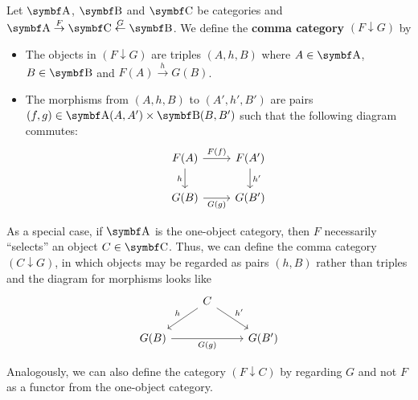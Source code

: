 \begin{definition}\label{def:comma_category}\cite[definition 2.3.1]{Leinster2014}
  Let \( \Bold A \), \( \Bold B \) and \( \Bold C \) be categories and \( \Bold A \overset F \to \Bold C \overset G \leftarrow \Bold B \). We define the \textbf{comma category} \( (F \downarrow G) \) by
  \begin{itemize}
    \item The objects in \( (F \downarrow G) \) are triples \( (A, h, B) \) where \( A \in \Bold A \), \( B \in \Bold B \) and \( F(A) \overset h \to G(B) \).
    \item The morphisms from \( (A, h, B) \) to \( (A', h', B') \) are pairs \( (f, g) \in \Bold{A}(A, A') \times \Bold{B}(B, B') \) such that the following diagram commutes:
    \begin{equation}\label{def:comma_category/universal_property}
      \begin{tikzcd}
        F(A) \arrow[r, "F(f)"] \arrow[d, "h"'] & F(A') \arrow[d, "h'"] \\
        G(B) \arrow[r, "G(g)"']                & G(B')
      \end{tikzcd}
    \end{equation}
  \end{itemize}

  As a special case, if \( \Bold A \) is the one-object category, then \( F \) necessarily \enquote{selects} an object \( C \in \Bold C \). Thus, we can define the comma category \( (C \downarrow G) \), in which objects may be regarded as pairs \( (h, B) \) rather than triples and the diagram for morphisms looks like
  \begin{equation*}
    \begin{tikzcd}
                               & C \arrow[ld, "h"'] \arrow[rd, "h'"] & \\
      G(B) \arrow[rr, "G(g)"'] &                                     & G(B')
    \end{tikzcd}
  \end{equation*}

  Analogously, we can also define the category \( (F \downarrow C) \) by regarding \( G \) and not \( F \) as a functor from the one-object category.
\end{definition}

